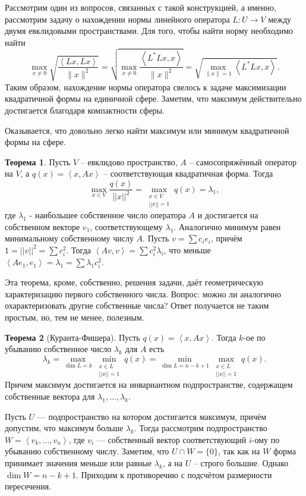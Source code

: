 \documentclass[10pt,a4paper,oneside]{book}
\theoremstyle{definition}
\newtheorem{thm}{{\color{red!40!black} Теорема}}
\def\lan{\left\langle }
\def\ran{\right\rangle}
\def\thrm{\begin{thm}}
\def\ethrm{\end{thm}}
\begin{document}
Рассмотрим один из вопросов, связанных с такой конструкцией, а именно, рассмотрим задачу о нахождении нормы линейного оператора $L \colon U \to V$ между двумя евклидовыми пространствами. Для того, чтобы найти  норму необходимо найти $$\max_{x\neq 0}\sqrt{\frac{\lan Lx,Lx\ran}{\|x\|^2}}=\sqrt{\max_{x\neq 0}\frac{\lan L^*Lx,x\ran}{\|x\|^2}}=\sqrt{\max_{\|x\|=1} \lan L^*Lx,x\ran}.$$
Таким образом, нахождение нормы оператора свелось к задаче максимизации квадратичной формы на единичной сфере. Заметим, что максимум действительно достигается благодаря компактности сферы.

Оказывается, что довольно легко найти максимум или минимум квадратичной формы на сфере.



\thrm Пусть $V$ -- евклидово пространство, $A$ -- самосопряжённый оператор на $V$, а $q(x)=\lan x,Ax\ran$ -- соответствующая квадратичная форма. Тогда 
$$\max_{ x\in V } \frac{q(x)}{||x||^2}=\max_{\substack{ x\in V \\ ||x||=1}} q(x)=\lambda_1,$$
 где $\lambda_1$ - наибольшее собственное число оператора $A$ и достигается на собственном векторе $v_1$, соответствующему $\lambda_1$. Аналогично минимум равен минимальному собственному числу $A$. 
\proof
Пусть $v=\sum c_i e_i$, причём $1=||v||^2=\sum c_i^2$. Тогда $\lan Av,v\ran = \sum c^2_i \lambda_i $, что меньше $\lan A e_1,e_1\ran= \lambda_1= \sum \lambda_1 c_i^2$.
\endproof
\ethrm

Эта теорема, кроме, собственно, решения задачи, даёт геометрическую характеризацию первого собственного числа. Вопрос: можно ли аналогично охарактеризовать другие собственные числа? Ответ получается не таким простым, но, тем не менее, полезным.

\thrm[Куранта-Фишера] Пусть $q(x)=\lan x, Ax\ran$. Тогда $k$-ое по убыванию собственное число $\lambda_k$ для $A$ есть 
$$ \lambda_k=\max_{\dim L=k} \min_{\substack{ x\in L \\ ||x||=1}} q(x) = \min_{\dim L=n-k+1} \max_{\substack{ x\in L \\ ||x||=1}} q(x).$$
Причем максимум достигается на инвариантном подпространстве, содержащем собственные вектора для $\lambda_1,\dots,\lambda_k$.
\ethrm
\proof Пусть $U$ --- подпространство на котором достигается максимум, причём допустим, что максимум больше $\lambda_k$. Тогда рассмотрим подпространство $W=\lan v_k,\dots,v_n\ran$, где $v_i$ --- собственный вектор соответствующий $i$-ому по убыванию собственному числу. Заметим, что $U\cap W=\{0\}$, так как на $W$ форма принимает значения меньше или равные $\lambda_k$, а на $U$ -- строго большие. Однако $\dim W=n-k+1$. Приходим к противоречию с подсчётом размерности пересечения. 
\endproof
\end{document}
